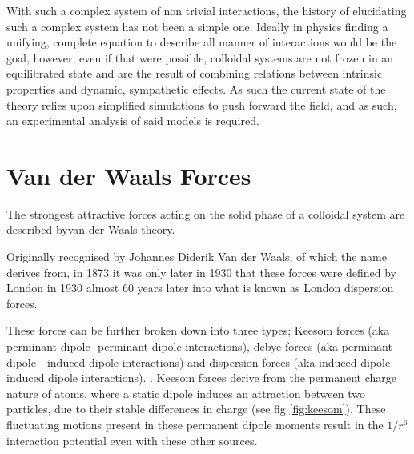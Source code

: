 With such a complex system of non trivial interactions, the history of elucidating such a complex system has not been a simple one. Ideally in physics finding a unifying, complete equation to describe all manner of interactions would be the goal, however, even if that were possible, colloidal systems are not frozen in an equilibrated state and are the result of combining relations between intrinsic properties and dynamic, sympathetic effects. As such the current state of the theory relies upon simplified simulations to push forward the field, and as such, an experimental analysis %
 of said models is required. \cite{FoundColloidBook}\cite{IsGreenBook}



\section{Van der Waals Forces}
The %
strongest attractive forces %
acting %
on the solid phase of a colloidal system %
 are described byvan der Waals %
 theory.

Originally recognised by Johannes Diderik Van der Waals, of which the name derives from, in 1873 \cite{vanderWaals} it was only later in 1930 that these forces were defined by London in 1930\cite{London} almost 60 years later into what is known as London dispersion forces. 

These forces can be further broken down into three types;  Keesom forces (aka perminant dipole -perminant dipole interactions), debye forces (aka perminant dipole - induced dipole interactions) and dispersion forces (aka induced dipole - induced dipole interactions). \cite{sciDirBook}. Keesom forces derive from the permanent charge nature of atoms, where a static dipole induces an attraction between two particles, due to their stable differences in charge (see fig \ref{fig:keesom}). These fluctuating motions present in these permanent dipole moments result in the $1/r^6$ interaction potential even with these other sources.

